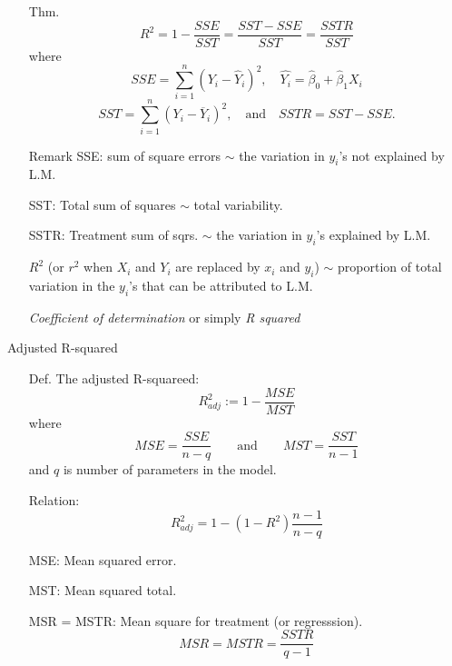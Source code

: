 \begin{frame}

	\begin{enumerate}
		\item[Thm.] $$R^2 = 1 - \frac{SSE}{SST} = \frac{SST-SSE}{SST} = \frac{SSTR}{SST} $$ where
			\[
				SSE = \sum_{i=1}^n \left(Y_i - \widehat{Y}_i \right)^2, \quad \widehat{Y_i} = \hat{\beta}_0+\hat{\beta}_1 X_i
			\]
			\[
				SST =  \sum_{i=1}^n \left(Y_i - \overline{Y}_i \right)^2, \quad\text{and}\quad
				SSTR = SST-SSE.
			\]
			\vfill
		\item[Remark] SSE: sum of square errors $\sim$ the variation in $y_i$'s not explained by L.M.\\[1em]
		\item[] SST: Total sum of squares $\sim$ total variability. \\[1em]
		\item[] SSTR: Treatment sum of sqrs. $\sim$ the variation in $y_i$'s explained by L.M. \\[1em]
		\item[] $R^2$ (or $r^2$ when $X_i$ and $Y_i$ are replaced by $x_i$ and $y_i$) $\sim$ proportion of total variation in the $y_i$'s that can be attributed to L.M.  \\
		\item[]
			\begin{center}
			{\it Coefficient of determination} or simply {\it R squared}
			\end{center}
	\end{enumerate}
\end{frame}
\begin{frame}
\end{frame}
\begin{frame}{Adjusted R-squared}

	\begin{enumerate}
		\item[Def.] The adjusted R-squareed:
	\[
		R^2_{adj} := 1-\frac{MSE}{MST}
	\]
where
\[
	MSE = \frac{SSE}{n-q} \qquad\text{and}\qquad MST = \frac{SST}{n-1}
\]
and $q$ is number of parameters in the model.
\vfill
\item[Relation:]
	\[
		R^2_{adj} = 1- \left(1-R^2\right) \frac{n-1}{n-q}
	\]
	\vfill
\item[] MSE: Mean squared error.
\item[] MST: Mean squared total.
\item[] MSR = MSTR: Mean square for treatment (or regresssion).
	\[
		MSR = MSTR = \frac{SSTR}{q-1}
	\]
	\end{enumerate}
\end{frame}
